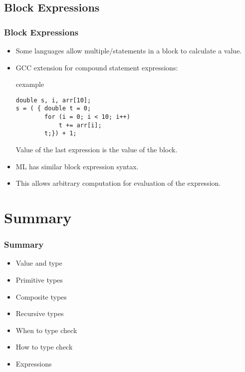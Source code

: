 \subsection{Block Expressions}
\begin{frame}[fragile]
 \frametitle{Block Expressions}
\begin{itemize}
\item Some languages allow multiple/statements in a block to calculate a value.
\item GCC extension for compound statement expressions:\\
\begin{beamercolorbox}{cexample}
\begin{lstlisting}
double s, i, arr[10];
s = ( { double t = 0; 
        for (i = 0; i < 10; i++)
            t += arr[i];
        t;}) + 1;    
\end{lstlisting}
\end{beamercolorbox}
Value of the last expression is the value of the block.
\item ML has similar block expression syntax.
\item This allows arbitrary computation for evaluation of the expression.
\end{itemize}
\end{frame}

\section{Summary}
\begin{frame}
\frametitle{Summary}
\begin{itemize}
\item Value and type
\item Primitive types
\item Composite types
\item Recursive types
\item When to type check
\item How to type check
\item Expressions
\end{itemize}

\end{frame}




